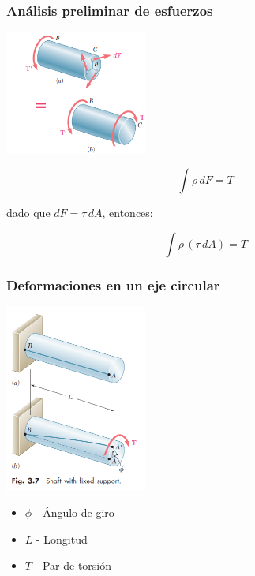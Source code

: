 \documentclass{beamer}
\begin{document}
\begin{frame}
\justifying
\frametitle{Análisis preliminar de esfuerzos}

\begin{center}
\includegraphics[width=0.35\textwidth]{img/shaft_torque_diagram.PNG}
\end{center}

$$ \int \rho \, dF = T $$

dado que $dF = \tau \, dA$, entonces:

$$ \int \rho \, (\tau \, dA) = T $$

\end{frame}


\begin{frame}
\justifying
\frametitle{Deformaciones en un eje circular}

\begin{center}
\includegraphics[width=0.35\textwidth]{img/shaft_fixed.PNG}
\end{center}

\begin{itemize}
\item $\phi$  - Ángulo de giro
\item $L$ - Longitud
\item $T$ - Par de torsión
\end{itemize}


\end{frame}
\end{document}
